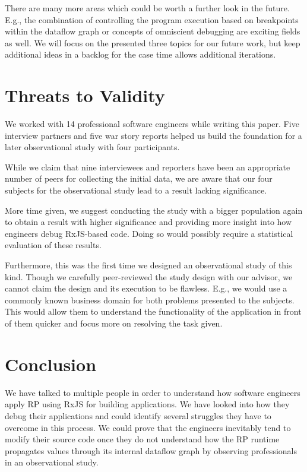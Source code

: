 \documentclass[12pt,a4paper]{article}
\begin{document}
There are many more areas which could be worth a further look in the future. E.g., the combination of controlling the program execution based on breakpoints within the dataflow graph or concepts of omniscient debugging are exciting fields as well. We will focus on the presented three topics for our future work, but keep additional ideas in a backlog for the case time allows additional iterations.

\section{Threats to Validity}
\label{sec:threats}

We worked with 14 professional software engineers while writing this paper. Five interview partners and five war story reports helped us build the foundation for a later observational study with four participants.

While we claim that nine interviewees and reporters have been an appropriate number of peers for collecting the initial data, we are aware that our four subjects for the observational study lead to a result lacking significance.

More time given, we suggest conducting the study with a bigger population again to obtain a result with higher significance and providing more insight into how engineers debug RxJS-based code. Doing so would possibly require a statistical evaluation of these results.

Furthermore, this was the first time we designed an observational study of this kind. Though we carefully peer-reviewed the study design with our advisor, we cannot claim the design and its execution to be flawless. E.g., we would use a commonly known business domain for both problems presented to the subjects. This would allow them to understand the functionality of the application in front of them quicker and focus more on resolving the task given.

\section{Conclusion}
\label{sec:conclusion}

We have talked to multiple people in order to understand how software engineers apply RP using RxJS for building applications. We have looked into how they debug their applications and could identify several struggles they have to overcome in this process. We could prove that the engineers inevitably tend to modify their source code once they do not understand how the RP runtime propagates values through its internal dataflow graph by observing professionals in an observational study.
\end{document}

